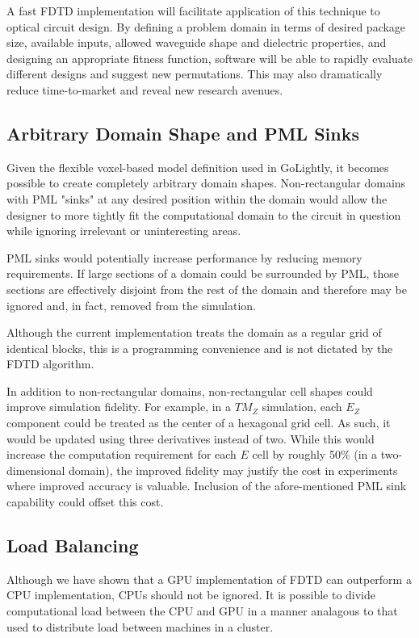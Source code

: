 A fast FDTD implementation will facilitate application of this technique to optical circuit design. By defining a problem domain in terms of desired package size, available inputs, allowed waveguide shape and dielectric properties, and designing an appropriate fitness function, software will be able to rapidly evaluate different designs and suggest new permutations. This may also dramatically reduce time-to-market and reveal new research avenues. 


\subsection{Arbitrary Domain Shape and PML Sinks}
Given the flexible voxel-based model definition used in GoLightly, it becomes possible to create completely arbitrary domain shapes. Non-rectangular domains with PML "sinks" at any desired position within the domain would allow the designer to more tightly fit the computational domain to the circuit in question while ignoring irrelevant or uninteresting areas.

PML sinks would potentially increase performance by reducing memory requirements. If large sections of a domain could be surrounded by PML, those sections are effectively disjoint from the rest of the domain and therefore may be ignored and, in fact, removed from the simulation. 

Although the current implementation treats the domain as a regular grid of identical blocks, this is a programming convenience and is not dictated by the FDTD algorithm.

In addition to non-rectangular domains, non-rectangular cell shapes could improve simulation fidelity. For example, in a $TM_Z$ simulation, each $E_Z$ component could be treated as the center of a hexagonal grid cell. As such, it would be updated using three derivatives instead of two. While this would increase the computation requirement for each $E$ cell by roughly 50\% (in a two-dimensional domain), the improved fidelity may justify the cost in experiments where improved accuracy is valuable. Inclusion of the afore-mentioned PML sink capability could offset this cost. 

\subsection{Load Balancing}
Although we have shown that a GPU implementation of FDTD can outperform a CPU implementation, CPUs should not be ignored. It is possible to divide computational load between the CPU and GPU in a manner analagous to that used to distribute load between machines in a cluster. 

